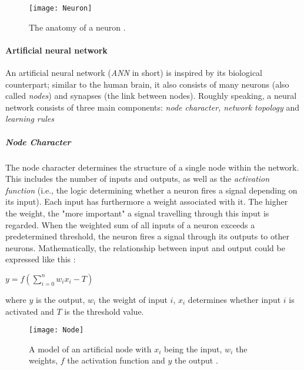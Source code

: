 \documentclass[draft,final]{vutinfth} %
\begin{document}
\begin{figure}
\begin{center}
\texttt{[image: Neuron]}
\end{center}
\caption{The anatomy of a neuron \cite{zou2009overview}.}
\end{figure}

\paragraph{Artificial neural network} An artificial neural network (\emph{ANN} in short) is inspired by its biological counterpart; similar to the human brain, it also consists of many neurons (also called \emph{nodes}) and synapses (the link between nodes). Roughly speaking, a neural network consists of three main components: \emph{node character, network topology} and \emph{learning rules} \cite{zou2009overview}

\subparagraph{Node Character} The node character determines the structure of a single node within the network. This includes the number of inputs and outputs, as well as the \emph{activation function} (i.e., the logic determining whether a neuron fires a signal depending on its input). Each input has furthermore a weight associated with it. The higher the weight, the "more important" a signal travelling through this input is regarded. When the weighted sum of all inputs of a neuron exceeds a predetermined threshold, the neuron fires a signal through its outputs to other neurons. Mathematically, the relationship between input and output could be expressed like this \cite{mcculloch1943logical}:
\begin{center}
$y=f(\sum_{i=0}^n w_i x_i - T)$
\end{center}
where $y$ is the output, $w_i$ the weight of input $i$, $x_i$ determines whether input $i$ is activated and $T$ is the threshold value.\\
\begin{figure}
\begin{center}
\texttt{[image: Node]}
\end{center}
\caption{A model of an artificial node with $x_i$ being the input, $w_i$ the weights, $f$ the activation function and $y$ the output \cite{zou2009overview}.}
\end{figure}
\end{document}
